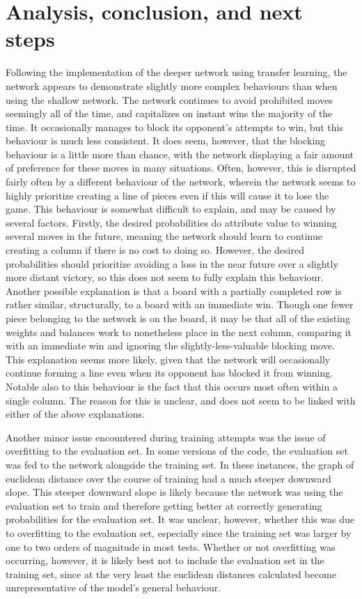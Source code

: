 \documentclass[12pt]{article}
\begin{document}
\section{Analysis, conclusion, and next steps}
Following the implementation of the deeper network using transfer learning, the network appears to demonstrate slightly more complex behaviours than when using the shallow network. The network continues to avoid prohibited moves seemingly all of the time, and capitalizes on instant wins the majority of the time. It occasionally manages to block its opponent’s attempts to win, but this behaviour is much less consistent. It does seem, however, that the blocking behaviour is a little more than chance, with the network displaying a fair amount of preference for these moves in many situations. Often, however, this is disrupted fairly often by a different behaviour of the network, wherein the network seems to highly prioritize creating a line of pieces even if this will cause it to lose the game. This behaviour is somewhat difficult to explain, and may be caused by several factors. Firstly, the desired probabilities do attribute value to winning several moves in the future, meaning the network should learn to continue creating a column if there is no cost to doing so. However, the desired probabilities should prioritize avoiding a loss in the near future over a slightly more distant victory, so this does not seem to fully explain this behaviour. Another possible explanation is that a board with a partially completed row is rather similar, structurally, to a board with an immediate win. Though one fewer piece belonging to the network is on the board, it may be that all of the existing weights and balances work to nonetheless place in the next column, comparing it with an immediate win and ignoring the slightly-less-valuable blocking move. This explanation seems more likely, given that the network will occasionally continue forming a line even when its opponent has blocked it from winning. Notable also to this behaviour is the fact that this occurs most often within a single column. The reason for this is unclear, and does not seem to be linked with either of the above explanations.

Another minor issue encountered during training attempts was the issue of overfitting to the evaluation set. In some versions of the code, the evaluation set was fed to the network alongside the training set. In these instances, the graph of euclidean distance over the course of training had a much steeper downward slope. This steeper downward slope is likely because the network was using the evaluation set to train and therefore getting better at correctly generating probabilities for the evaluation set. It was unclear, however, whether this was due to overfitting to the evaluation set, especially since the training set was larger by one to two orders of magnitude in most tests. Whether or not overfitting was occurring, however, it is likely best not to include the evaluation set in the training set, since at the very least the euclidean distances calculated become unrepresentative of the model’s general behaviour.
\end{document}
